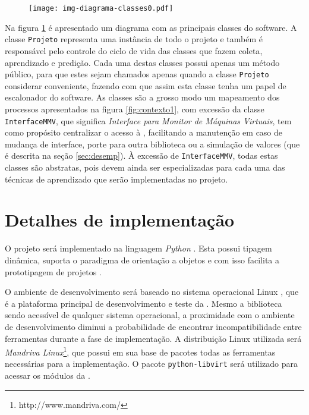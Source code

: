 
\begin{figure}[htp]
\centering
\texttt{[image: img-diagrama-classes0.pdf]}
\label{fig:diagramaclasses0}
\end{figure}

Na figura \ref{fig:diagramaclasses0} é apresentado um diagrama com as
principais classes do software. A classe \texttt{Projeto} representa uma
instância de todo o projeto e também é responsável pelo controle do ciclo
de vida das classes que fazem coleta, aprendizado e predição. Cada uma
destas classes possui apenas um método público, para que estes sejam
chamados apenas quando a classe \texttt{Projeto} considerar conveniente,
fazendo com que assim esta classe tenha um papel de escalonador do
software. As classes são a grosso modo um mapeamento dos processos
apresentados na figura \ref{fig:contexto1}, com excessão da classe
\texttt{InterfaceMMV}, que significa \emph{Interface para Monitor de
Máquinas Virtuais}, tem como propósito centralizar o acesso à \libvirt{},
facilitando a manutenção em caso de mudança de interface, porte para outra
biblioteca ou a simulação de valores (que é descrita na seção
\ref{sec:desemp}). À excessão de \texttt{InterfaceMMV}, todas estas
classes são abstratas, pois devem ainda ser especializadas para cada uma
das técnicas de aprendizado que serão implementadas no projeto.


\section{Detalhes de implementação}

O projeto será implementado na linguagem \emph{Python} \cite{rossum1995python}.
Esta possui tipagem dinâmica, suporta o paradigma de orientação a objetos e com
isso facilita a prototipagem de projetos \cite{lutz2006programming}.

O ambiente de desenvolvimento será baseado no sistema operacional Linux
\cite{morimoto2004entendendo}, que é a plataforma principal de
desenvolvimento e teste da \libvirt{}. Mesmo a biblioteca sendo acessível
de qualquer sistema operacional, a proximidade com o ambiente de
desenvolvimento diminui a probabilidade de encontrar incompatibilidade
entre ferramentas durante a fase de implementação. A distribuição Linux
utilizada será \emph{Mandriva Linux}\footnote{http://www.mandriva.com/},
que possui em sua base de pacotes todas as ferramentas necessárias para a
implementação. O pacote \texttt{python-libvirt} será utilizado para acessar
os módulos da \libvirt{}.

